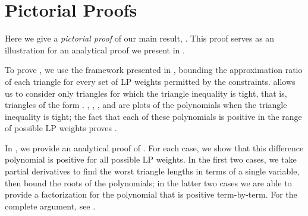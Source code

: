 \documentclass[11pt]{article}
\theoremstyle{definition}
\theoremstyle{remark}
\begin{document}
 \section{Pictorial Proofs} \label{sec:pic_proofs}
Here we give a \emph{pictorial proof} of our main result, . This
proof serves as an illustration for an analytical proof we present in
.

To prove , we use the framework presented in , bounding the approximation ratio of each triangle for every set of LP weights permitted by the constraints.  allows us to consider only triangles for which
the triangle inequality is tight, that is, triangles of the form .
, , , and  are plots of the polynomials  when the triangle inequality is tight; the fact that each of these polynomials is positive in the range of possible LP weights proves .

In , we provide an analytical proof of
. For each case, we show
that this difference polynomial is positive for all possible LP weights. In the first two cases,
we take partial derivatives to find the worst triangle lengths in terms of a single
variable, then bound the roots of the polynomials; in the latter two cases we
are able to provide a factorization for the polynomial that is positive
term-by-term. For the complete argument, see .
\end{document}

